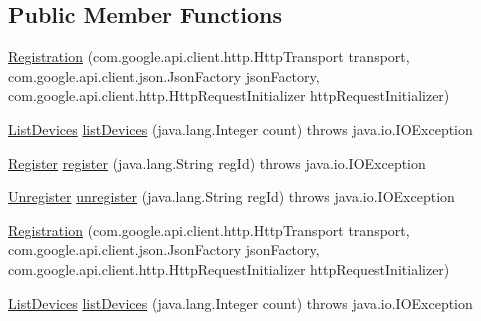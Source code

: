 \subsection*{Public Member Functions}
\begin{DoxyCompactItemize}
\item 
\hyperlink{classcom_1_1example_1_1lusifer_1_1myapplication_1_1backend_1_1registration_1_1_registration_afb3cbf533fac4bc602b77b17f76ed398}{Registration} (com.\+google.\+api.\+client.\+http.\+Http\+Transport transport, com.\+google.\+api.\+client.\+json.\+Json\+Factory json\+Factory, com.\+google.\+api.\+client.\+http.\+Http\+Request\+Initializer http\+Request\+Initializer)
\item 
\hyperlink{classcom_1_1example_1_1lusifer_1_1myapplication_1_1backend_1_1registration_1_1_registration_1_1_list_devices}{List\+Devices} \hyperlink{classcom_1_1example_1_1lusifer_1_1myapplication_1_1backend_1_1registration_1_1_registration_af0bf42ee0aa9168a43b073668604eeb9}{list\+Devices} (java.\+lang.\+Integer count)  throws java.\+io.\+I\+O\+Exception 
\item 
\hyperlink{classcom_1_1example_1_1lusifer_1_1myapplication_1_1backend_1_1registration_1_1_registration_1_1_register}{Register} \hyperlink{classcom_1_1example_1_1lusifer_1_1myapplication_1_1backend_1_1registration_1_1_registration_a131f48ab35d49f5b003409dcad448c2b}{register} (java.\+lang.\+String reg\+Id)  throws java.\+io.\+I\+O\+Exception 
\item 
\hyperlink{classcom_1_1example_1_1lusifer_1_1myapplication_1_1backend_1_1registration_1_1_registration_1_1_unregister}{Unregister} \hyperlink{classcom_1_1example_1_1lusifer_1_1myapplication_1_1backend_1_1registration_1_1_registration_a7b56d403c4e86f9ceef1bd011c868da7}{unregister} (java.\+lang.\+String reg\+Id)  throws java.\+io.\+I\+O\+Exception 
\item 
\hyperlink{classcom_1_1example_1_1lusifer_1_1myapplication_1_1backend_1_1registration_1_1_registration_afb3cbf533fac4bc602b77b17f76ed398}{Registration} (com.\+google.\+api.\+client.\+http.\+Http\+Transport transport, com.\+google.\+api.\+client.\+json.\+Json\+Factory json\+Factory, com.\+google.\+api.\+client.\+http.\+Http\+Request\+Initializer http\+Request\+Initializer)
\item 
\hyperlink{classcom_1_1example_1_1lusifer_1_1myapplication_1_1backend_1_1registration_1_1_registration_1_1_list_devices}{List\+Devices} \hyperlink{classcom_1_1example_1_1lusifer_1_1myapplication_1_1backend_1_1registration_1_1_registration_af0bf42ee0aa9168a43b073668604eeb9}{list\+Devices} (java.\+lang.\+Integer count)  throws java.\+io.\+I\+O\+Exception 

\end{DoxyCompactItemize}
